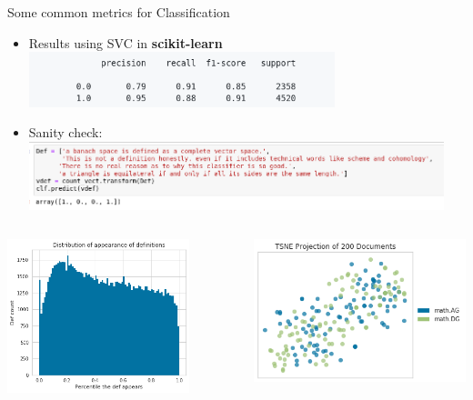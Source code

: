 \documentclass{beamer}
\begin{document}
\begin{frame}{Some common metrics for Classification}
    \begin{itemize}
    \item Results using SVC in \textbf{scikit-learn}
    \includegraphics[width=0.7\textwidth]{class_results_svc.png}
    \item Sanity check:
    \includegraphics[width=0.95\textwidth]{sanity_check.png}
    \end{itemize}
    \begin{columns}[T]
        \begin{column}{0.5\textwidth}
     \includegraphics[width=0.8\textwidth]{def_appear_hist.png}
        \end{column}
        \begin{column}{0.5\textwidth}
    \includegraphics[width=\textwidth]{scatter_plot.png}
        \end{column}
    \end{columns}
\end{frame}
\end{document}
